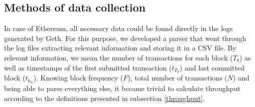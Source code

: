 \subsection{Methods of data collection}
In case of Ethereum, all necessary data could be found directly in the logs generated by Geth. For this purpose, we developed a parser that went through the log files extracting relevant information and storing it in a CSV file. By relevant information, we mean the number of transactions for each block ($T_b$) as well as timestamps of the first submitted transaction ($t_{T_0}$) and last committed block ($t_{b_N}$). Knowing block frequency ($F$), total number of transactions ($N$) and being able to parse everything else, it became trivial to calculate throughput according to the definitions presented in subsection \ref{throughput}.
